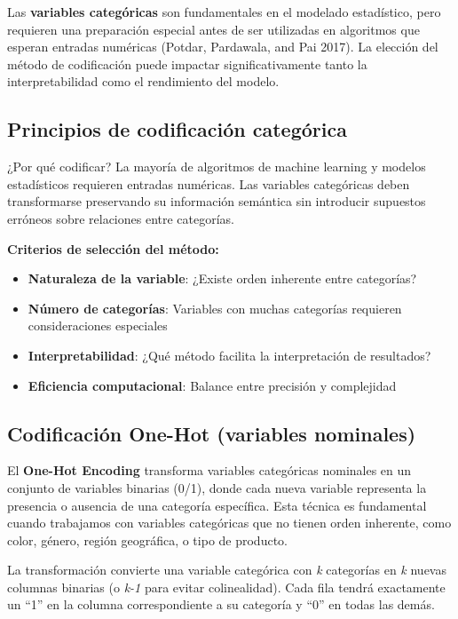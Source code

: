 \documentclass[
  letterpaper,
  DIV=11,
  numbers=noendperiod]{scrreprt}
\providecommand{\tightlist}{%
  \setlength{\itemsep}{0pt}\setlength{\parskip}{0pt}}
\begin{document}
Las \textbf{variables categóricas} son fundamentales en el modelado
estadístico, pero requieren una preparación especial antes de ser
utilizadas en algoritmos que esperan entradas numéricas (Potdar,
Pardawala, and Pai 2017). La elección del método de codificación puede
impactar significativamente tanto la interpretabilidad como el
rendimiento del modelo.

\subsection{Principios de codificación
categórica}\label{principios-de-codificaciuxf3n-categuxf3rica}

¿Por qué codificar? La mayoría de algoritmos de machine learning y
modelos estadísticos requieren entradas numéricas. Las variables
categóricas deben transformarse preservando su información semántica sin
introducir supuestos erróneos sobre relaciones entre categorías.

\textbf{Criterios de selección del método:}

\begin{itemize}
\tightlist
\item
  \textbf{Naturaleza de la variable}: ¿Existe orden inherente entre
  categorías?
\item
  \textbf{Número de categorías}: Variables con muchas categorías
  requieren consideraciones especiales
\item
  \textbf{Interpretabilidad}: ¿Qué método facilita la interpretación de
  resultados?
\item
  \textbf{Eficiencia computacional}: Balance entre precisión y
  complejidad
\end{itemize}

\subsection{Codificación One-Hot (variables
nominales)}\label{codificaciuxf3n-one-hot-variables-nominales}

El \textbf{One-Hot Encoding} transforma variables categóricas nominales
en un conjunto de variables binarias (0/1), donde cada nueva variable
representa la presencia o ausencia de una categoría específica. Esta
técnica es fundamental cuando trabajamos con variables categóricas que
no tienen orden inherente, como color, género, región geográfica, o tipo
de producto.

La transformación convierte una variable categórica con \emph{k}
categorías en \emph{k} nuevas columnas binarias (o \emph{k-1} para
evitar colinealidad). Cada fila tendrá exactamente un ``1'' en la
columna correspondiente a su categoría y ``0'' en todas las demás.
\end{document}
